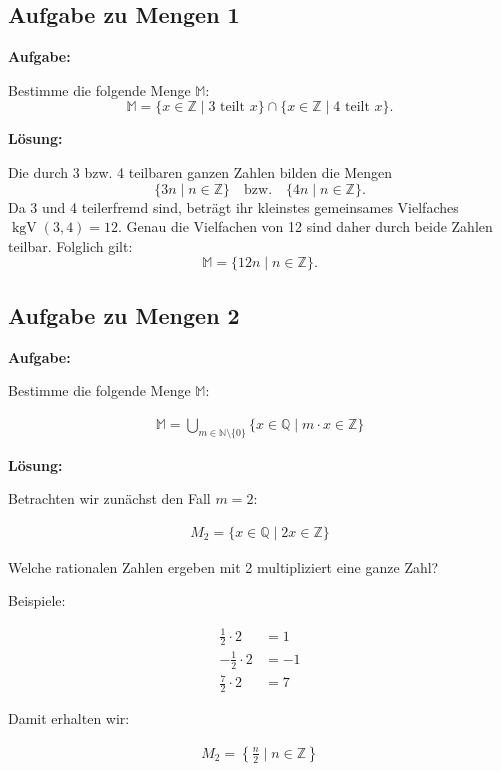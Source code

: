 \subsection{Aufgabe zu Mengen 1}

\textbf{Aufgabe:}

Bestimme die folgende Menge $\mathbb{M}$:
\[
 \mathbb{M}=\{x\in\mathbb{Z}\mid 3\text{ teilt }x\}
 \cap\{x\in\mathbb{Z}\mid 4\text{ teilt }x\}.
\]

\textbf{Lösung:}

Die durch 3 bzw. 4 teilbaren ganzen Zahlen bilden die Mengen
\[
 \{3n\mid n\in\mathbb{Z}\}
 \quad\text{bzw.}\quad
 \{4n\mid n\in\mathbb{Z}\}.
\]
Da 3 und 4 teilerfremd sind, beträgt ihr kleinstes gemeinsames
Vielfaches $\operatorname{kgV}(3,4)=12$. Genau die Vielfachen von 12
sind daher durch beide Zahlen teilbar. Folglich gilt:
\[
 \boxed{\mathbb{M}=\{12n\mid n\in\mathbb{Z}\}.}
\]

\subsection{Aufgabe zu Mengen 2}

\textbf{Aufgabe:}

Bestimme die folgende Menge $\mathbb{M}$:

\begin{align*}
	\mathbb{M}
	= \bigcup_{m\in\mathbb{N}\setminus\{0\}}
	\{x\in\mathbb{Q}\mid m\cdot x\in\mathbb{Z}\}
\end{align*}

\textbf{Lösung:}

Betrachten wir zunächst den Fall $m=2$:

\begin{align*}
	M_2=\{x\in\mathbb{Q}\mid 2x\in\mathbb{Z}\}
\end{align*}

Welche rationalen Zahlen ergeben mit 2 multipliziert
eine ganze Zahl?

Beispiele:

\begin{align*}
	\frac{1}{2}\cdot 2 &= 1\\
	-\frac{1}{2}\cdot 2 &= -1\\
	\frac{7}{2}\cdot 2 &= 7
\end{align*}

Damit erhalten wir:

\begin{align*}
	M_2
	= \left\{\frac{n}{2}\mid n\in\mathbb{Z}\right\}
\end{align*}

